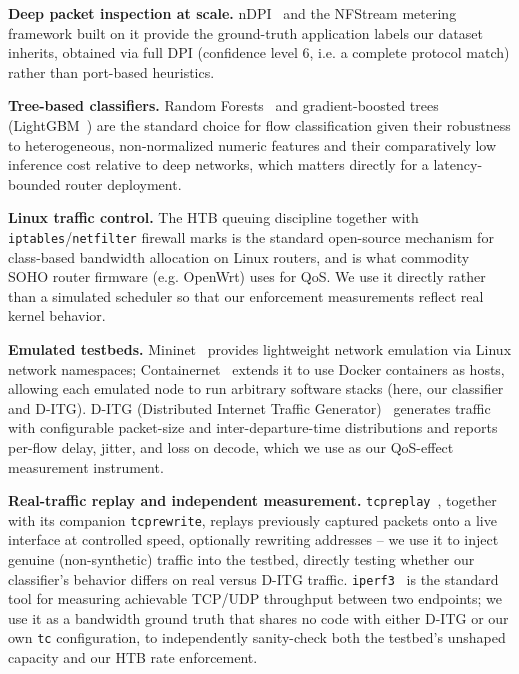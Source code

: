 \documentclass[10pt,twocolumn]{article}
\begin{document}
\textbf{Deep packet inspection at scale.} nDPI~\cite{ndpi} and the
NFStream metering framework built on it provide the ground-truth
application labels our dataset inherits, obtained via full DPI
(confidence level 6, i.e. a complete protocol match) rather than
port-based heuristics.

\textbf{Tree-based classifiers.} Random Forests~\cite{breiman2001random}
and gradient-boosted trees (LightGBM~\cite{ke2017lightgbm}) are the
standard choice for flow classification given their robustness to
heterogeneous, non-normalized numeric features and their comparatively
low inference cost relative to deep networks, which matters directly for
a latency-bounded router deployment.

\textbf{Linux traffic control.} The HTB queuing discipline together with
\texttt{iptables}/\texttt{netfilter} firewall marks is the standard
open-source mechanism for class-based bandwidth allocation on Linux
routers, and is what commodity SOHO router firmware (e.g. OpenWrt) uses
for QoS. We use it directly rather than a simulated scheduler so that our
enforcement measurements reflect real kernel behavior.

\textbf{Emulated testbeds.} Mininet~\cite{lantz2010network} provides
lightweight network emulation via Linux network namespaces; Containernet~\cite{containernet}
extends it to use Docker containers as hosts, allowing each emulated node
to run arbitrary software stacks (here, our classifier and D-ITG). D-ITG
(Distributed Internet Traffic Generator)~\cite{avallone2004ditg}
generates traffic with configurable packet-size and inter-departure-time
distributions and reports per-flow delay, jitter, and loss on decode,
which we use as our QoS-effect measurement instrument.

\textbf{Real-traffic replay and independent measurement.}
\texttt{tcpreplay}~\cite{tcpreplay}, together with its companion
\texttt{tcprewrite}, replays previously captured packets onto a live
interface at controlled speed, optionally rewriting addresses -- we use
it to inject genuine (non-synthetic) traffic into the testbed, directly
testing whether our classifier's behavior differs on real versus D-ITG
traffic. \texttt{iperf3}~\cite{iperf3} is the standard tool for measuring
achievable TCP/UDP throughput between two endpoints; we use it as a
bandwidth ground truth that shares no code with either D-ITG or our own
\texttt{tc} configuration, to independently sanity-check both the
testbed's unshaped capacity and our HTB rate enforcement.
\end{document}
